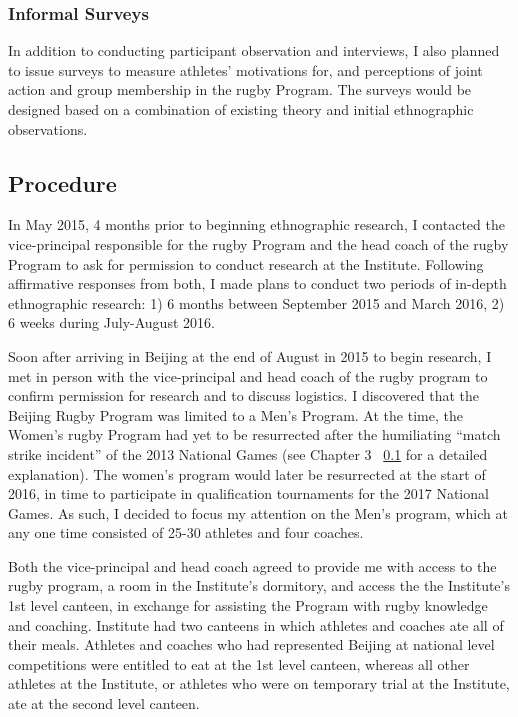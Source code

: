   \subsubsection{Informal Surveys}
  In addition to conducting participant observation and interviews, I also planned to issue surveys to measure athletes' motivations for, and perceptions of joint action and group membership in the rugby Program.  The surveys would be designed based on a combination of existing theory and initial ethnographic observations.


\subsection{Procedure}

In May 2015, 4 months prior to beginning ethnographic research, I contacted the vice-principal responsible for the rugby Program and the head coach of the rugby Program to ask for permission to conduct research at the Institute.  Following affirmative responses from both, I made plans to conduct two periods of in-depth ethnographic research: 1) 6 months between September 2015 and March 2016, 2) 6 weeks during July-August 2016.

Soon after arriving in Beijing at the end of August in 2015 to begin research, I met in person with the vice-principal and head coach of the rugby program to confirm permission for research and to discuss logistics.  I discovered that the Beijing Rugby Program was limited to a Men's Program.  At the time, the Women's rugby Program had yet to be resurrected after the humiliating ``match strike incident'' of the 2013 National Games (see Chapter 3 ~\ref{} for a detailed explanation). The women's program would later be resurrected at the start of 2016, in time to participate in qualification tournaments for the 2017 National Games.  As such, I decided to focus my attention on the Men's program, which at any one time consisted of 25-30 athletes and four coaches.

Both the vice-principal and head coach agreed to provide me with access to the rugby program, a room in the Institute's dormitory, and access the the Institute's 1st level canteen, in exchange for assisting the Program with rugby knowledge and coaching.   Institute had two canteens in which athletes and coaches ate all of their meals.  Athletes and coaches who had represented Beijing at national level competitions were entitled to eat at the 1st level canteen, whereas all other athletes at the Institute, or athletes who were on temporary trial at the Institute, ate at the second level canteen.


